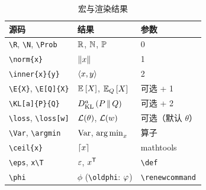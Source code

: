 \begin{table}[htbp]
  \centering
  \caption{宏与渲染结果}\label{tab:notation}
  \begin{tabular}{lll}
    \toprule
    源码 & 结果 & 参数 \\
    \midrule
    \verb|\R|, \verb|\N|, \verb|\Prob| & $\R$, $\N$, $\Prob$ & 0 \\
    \verb|\norm{x}| & $\norm{x}$ & 1 \\
    \verb|\inner{x}{y}| & $\inner{x}{y}$ & 2 \\
    \verb|\E{X}|, \verb|\E[Q]{X}| & $\E{X}$, $\E[Q]{X}$ & 可选 + 1 \\
    \verb|\KL[a]{P}{Q}| & $\KL[a]{P}{Q}$ & 可选 + 2 \\
    \verb|\loss|, \verb|\loss[w]| & $\loss$, $\loss[w]$ & 可选（默认 $\theta$） \\
    \verb|\Var|, \verb|\argmin| & $\Var$, $\argmin_x$ & 算子 \\
    \verb|\ceil{x}| & $\ceil{x}$ & mathtools \\
    \verb|\eps|, \verb|x\T| & $\eps$, $x\T$ & \verb|\def| \\
    \verb|\phi| & $\phi$ (\verb|\oldphi|: $\oldphi$) & \verb|\renewcommand| \\
    \bottomrule
  \end{tabular}
\end{table}
